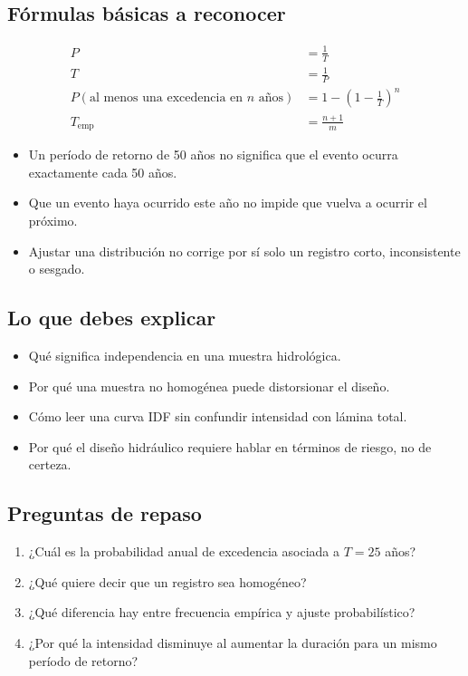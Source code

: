 \documentclass[11pt]{article}
\begin{document}
\subsection{Fórmulas básicas a reconocer}
\begin{align*}
P &= \frac{1}{T} \\
T &= \frac{1}{P} \\
P(\text{al menos una excedencia en } n \text{ años}) &= 1-\left(1-\frac{1}{T}\right)^n \\
T_{\text{emp}} &= \frac{n+1}{m}
\end{align*}

\begin{warnbox}
\begin{itemize}
\item Un período de retorno de 50 años no significa que el evento ocurra exactamente cada 50 años.
\item Que un evento haya ocurrido este año no impide que vuelva a ocurrir el próximo.
\item Ajustar una distribución no corrige por sí solo un registro corto, inconsistente o sesgado.
\end{itemize}
\end{warnbox}

\subsection{Lo que debes explicar}
\begin{itemize}
\item Qué significa independencia en una muestra hidrológica.
\item Por qué una muestra no homogénea puede distorsionar el diseño.
\item Cómo leer una curva IDF sin confundir intensidad con lámina total.
\item Por qué el diseño hidráulico requiere hablar en términos de riesgo, no de certeza.
\end{itemize}

\subsection{Preguntas de repaso}
\begin{enumerate}
\item ¿Cuál es la probabilidad anual de excedencia asociada a \(T=25\) años?
\item ¿Qué quiere decir que un registro sea homogéneo?
\item ¿Qué diferencia hay entre frecuencia empírica y ajuste probabilístico?
\item ¿Por qué la intensidad disminuye al aumentar la duración para un mismo período de retorno?
\end{enumerate}
\end{document}
